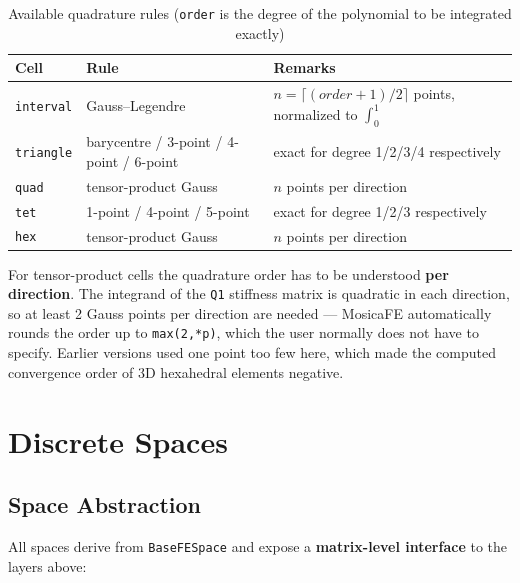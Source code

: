 \documentclass[11pt,oneside]{book}
\theoremstyle{definition}
\theoremstyle{plain}
\newenvironment{caution}{%
  \begin{tcolorbox}[colback=orange!5,colframe=orange!55,title=Caution,fonttitle=\bfseries]%
}{%
  \end{tcolorbox}%
}
\newcommand{\mosica}{\textsf{MosicaFE}}
\newcommand{\code}[1]{\texttt{#1}}
\begin{document}
\begin{table}[htbp]
\centering
\caption{Available quadrature rules (\code{order} is the degree of the polynomial to be integrated exactly)}
\label{tab:quad}
\begin{lrbox}{\guideTableBox}
\begin{tabular}{@{}lll@{}}
\toprule
Cell & Rule & Remarks \\
\midrule
\code{interval} & Gauss--Legendre & $n=\lceil(order+1)/2\rceil$ points, normalized to $\int_0^1$ \\
\code{triangle} & barycentre / 3-point / 4-point / 6-point & exact for degree 1/2/3/4 respectively \\
\code{quad} & tensor-product Gauss & $n$ points per direction \\
\code{tet} & 1-point / 4-point / 5-point & exact for degree 1/2/3 respectively \\
\code{hex} & tensor-product Gauss & $n$ points per direction \\
\bottomrule
\end{tabular}
\end{lrbox}%
\ifdim\wd\guideTableBox>\linewidth
  \resizebox{\linewidth}{!}{\usebox{\guideTableBox}}%
\else\usebox{\guideTableBox}\fi
\end{table}

\begin{caution}
For tensor-product cells the quadrature order has to be understood
\textbf{per direction}. The integrand of the \code{Q1} stiffness matrix is quadratic
in each direction, so at least 2 Gauss points per direction are needed --- \mosica{}
automatically rounds the order up to \code{max(2,*p)}, which the user normally does
not have to specify. Earlier versions used one point too few here, which made the
computed convergence order of 3D hexahedral elements negative.
\end{caution}

\chapter{Discrete Spaces}
\label{chap:spaces}

\section{Space Abstraction}

All spaces derive from \code{BaseFESpace} and expose a \textbf{matrix-level
interface} to the layers above:
\end{document}
